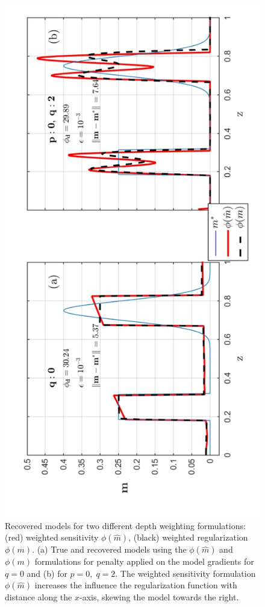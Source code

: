 \begin{figure}[h!]
\centering
\includegraphics[scale=0.55, angle=270]{1D_Wr_in_vs_out}
\caption{Recovered models for two different depth weighting  formulations: (red)  weighted sensitivity $\phi(\hat m)$,  (black)  weighted regularization $\phi(m)$.
(a) True and recovered models using the $\phi(\hat m)$ and $\phi(m)$ formulations for penalty applied on the model gradients for $q=0$ and (b) for $p= 0,\;q=2$.
The weighted sensitivity formulation $\phi(\hat m)$ increases the influence the regularization function with distance along the $x$-axis, skewing the model towards the right.}
\label{fig:1D_Wr_in_vs_out}
\end{figure}

